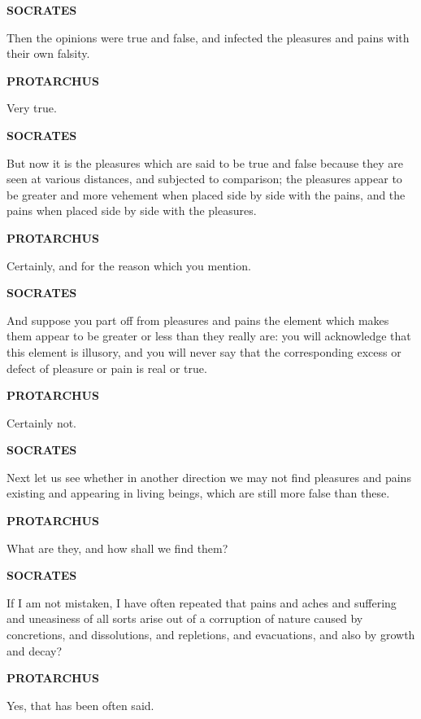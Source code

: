 \documentclass[11pt,letter]{article}
\begin{document}
\par \textbf{SOCRATES}
\par   Then the opinions were true and false, and infected the pleasures and pains with their own falsity.

\par \textbf{PROTARCHUS}
\par   Very true.

\par \textbf{SOCRATES}
\par   But now it is the pleasures which are said to be true and false because they are seen at various distances, and subjected to comparison; the pleasures appear to be greater and more vehement when placed side by side with the pains, and the pains when placed side by side with the pleasures.

\par \textbf{PROTARCHUS}
\par   Certainly, and for the reason which you mention.

\par \textbf{SOCRATES}
\par   And suppose you part off from pleasures and pains the element which makes them appear to be greater or less than they really are:  you will acknowledge that this element is illusory, and you will never say that the corresponding excess or defect of pleasure or pain is real or true.

\par \textbf{PROTARCHUS}
\par   Certainly not.

\par \textbf{SOCRATES}
\par   Next let us see whether in another direction we may not find pleasures and pains existing and appearing in living beings, which are still more false than these.

\par \textbf{PROTARCHUS}
\par   What are they, and how shall we find them?

\par \textbf{SOCRATES}
\par   If I am not mistaken, I have often repeated that pains and aches and suffering and uneasiness of all sorts arise out of a corruption of nature caused by concretions, and dissolutions, and repletions, and evacuations, and also by growth and decay?

\par \textbf{PROTARCHUS}
\par   Yes, that has been often said.
\end{document}
